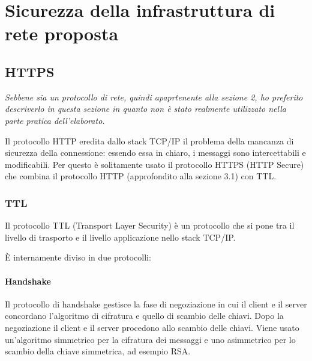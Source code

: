 \section{Sicurezza della infrastruttura di rete proposta}

\subsection{HTTPS}

\textit{Sebbene sia un protocollo di rete, quindi apaprtenente alla sezione 2, ho preferito descriverlo in questa sezione in quanto non è stato realmente utilizzato nella parte pratica dell'elaborato.}
\vspace{1em}

Il protocollo HTTP eredita dallo stack TCP/IP il problema della mancanza di sicurezza della connessione: essendo essa in chiaro, i messaggi sono intercettabili e modificabili. Per questo è solitamente usato il protocollo HTTPS (HTTP Secure) che combina il protocollo HTTP (approfondito alla sezione 3.1) con TTL.

\subsubsection{TTL}

Il protocollo TTL (Transport Layer Security) è un protocollo che si pone tra il livello di trasporto e il livello applicazione nello stack TCP/IP.

È internamente diviso in due protocolli:

\paragraph{Handshake}
Il protocollo di handshake gestisce la fase di negoziazione in cui il client e il server concordano l'algoritmo di cifratura e quello di scambio delle chiavi. Dopo la negoziazione il client e il server procedono allo scambio delle chiavi. Viene usato un'algoritmo simmetrico per la cifratura dei messaggi e uno asimmetrico per lo scambio della chiave simmetrica, ad esempio RSA.

